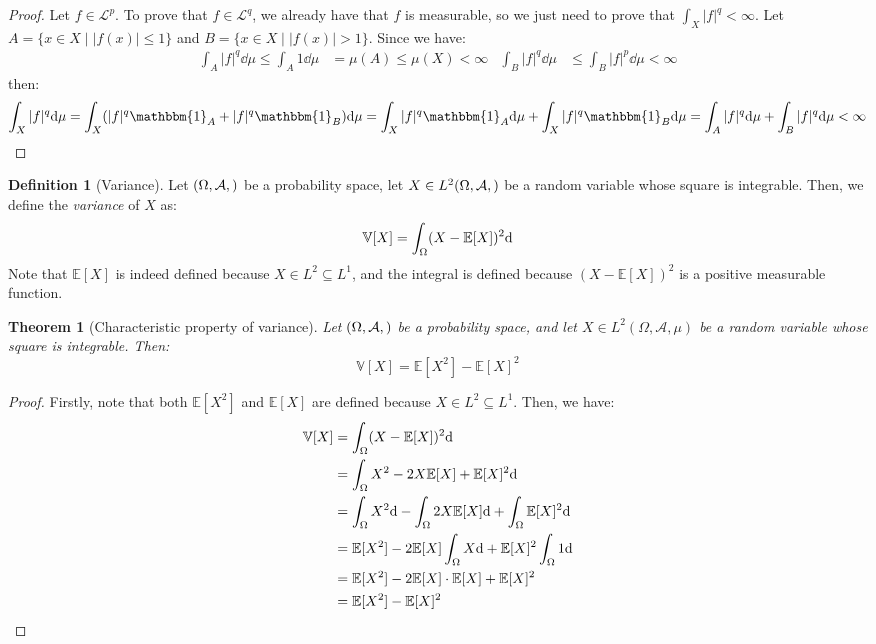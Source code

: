 \documentclass{article}
\newtheorem{theorem}{Theorem}[section]
\theoremstyle{definition}
\newtheorem{definition}{Definition}[section]
\theoremstyle{remark}
\theoremstyle{example}
\theoremstyle{notation}
\theoremstyle{axiom}
\newcommand{\E}[1]{\mathbb{E}[#1]}
\newcommand{\V}[1]{\mathbb{V}[#1]}
\let\P\relax
\begin{document}
\begin{proof}
		Let $f \in \mathcal{L}^p$. To prove that $f \in \mathcal{L}^q$, we already have that $f$ is measurable, so we just need to prove that $\int_X |f|^q < \infty$. Let $A = \{x \in X \mid |f(x)| \leq 1\}$ and $B = \{x \in X \mid |f(x)| > 1\}$. Since we have:
		\begin{align*}
				\int_A |f|^q \dd \mu \leq \int_A 1 \dd \mu &= \mu(A) \leq \mu(X) < \infty & \int_B |f|^q \dd \mu & \leq \int_B |f|^p \dd \mu < \infty
		\end{align*}
		then:
				$$\int_X |f|^q \dd \mu = \int_X (|f|^q\mathbbm{1}_A + |f|^q\mathbbm{1}_B) \dd \mu = \int_X |f|^q\mathbbm{1}_A \dd \mu + \int_X |f|^q\mathbbm{1}_B \dd \mu = \int_A |f|^q \dd \mu + \int_B |f|^q \dd \mu < \infty$$
\end{proof}


\begin{definition}[Variance] %
		Let $(\Omega, \mathcal{A}, \P)$ be a probability space, let $X \in L^2(\Omega, \mathcal{A}, \P)$ be a random variable whose square is integrable. Then, we define the \textit{variance} of $X$ as:
				$$\V{X} = \int_\Omega (X - \E{X})^2 \dd \P$$
		Note that $\E{X}$ is indeed defined because $X \in L^2 \subseteq L^1$, and the integral is defined because $(X - \E{X})^2$ is a positive measurable function.
\end{definition}

\begin{theorem}[Characteristic property of variance]
		Let $(\Omega, \mathcal{A}, \P)$ be a probability space, and let $X \in L^2(\Omega, \mathcal{A}, \mu)$ be a random variable whose square is integrable. Then:
				$$\V{X} = \E{X^2} - \E{X}^2$$
\end{theorem}

\begin{proof}
		Firstly, note that both $\E{X^2}$ and $\E{X}$ are defined because $X \in L^2 \subseteq L^1$. Then, we have:
		\begin{align*}
				\V{X} &= \int_\Omega (X - \E{X})^2 \dd \P\\
					  &= \int_\Omega X^2 - 2X\E{X} + \E{X}^2 \dd \P\\
					  &= \int_\Omega X^2 \dd \P - \int_\Omega 2X\E{X} \dd \P + \int_\Omega \E{X}^2 \dd \P\\
					  &= \E{X^2} - 2\E{X}\int_\Omega X \dd \P + \E{X}^2 \int_\Omega 1 \dd \P\\
					  &= \E{X^2} - 2 \E{X} \cdot \E{X} + \E{X}^2\\
					  &= \E{X^2} - \E{X}^2
		\end{align*}
\end{proof}
\end{document}
